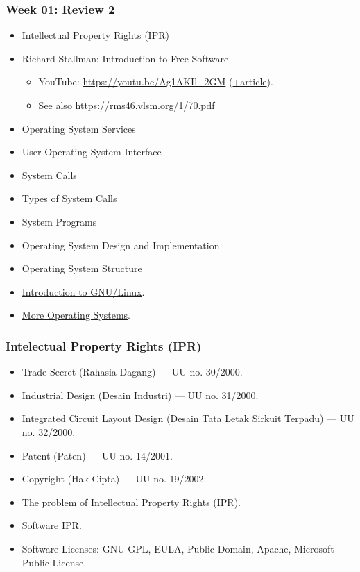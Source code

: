 \documentclass[aspectratio=169, xcolor=table, notheorems, hyperref={pdfpagelabels=false}]{beamer}
\begin{document}

\begin{frame}
\frametitle{Week 01: Review 2}

\begin{itemize}
\item Intellectual Property Rights (IPR)
\item Richard Stallman: Introduction to Free Software
\begin{itemize}
\item YouTube: \url{https://youtu.be/Ag1AKIl_2GM} 
      (\href{https://www.fsf.org/blogs/rms/20140407-geneva-tedx-talk-free-software-free-society}{+article}).
\item See also \url{https://rms46.vlsm.org/1/70.pdf}
\end{itemize}
\item Operating System Services
\item User Operating System Interface
\item System Calls
\item Types of System Calls
\item System Programs
\item Operating System Design and Implementation
\item Operating System Structure
\item \href{https://osp4diss.vlsm.org/Welcome2GNULinux.html}{Introduction to GNU/Linux}.
\item \href{https://osp4diss.vlsm.org/osp-115.html}{More Operating Systems}.
\end{itemize}
\end{frame}

\begin{frame}
\frametitle{Intelectual Property Rights (IPR)}
\begin{itemize}
\item Trade Secret (Rahasia Dagang) --- UU no. 30/2000.
\item Industrial Design (Desain Industri) --- UU no. 31/2000.
\item Integrated Circuit Layout Design (Desain Tata Letak Sirkuit Terpadu) --- UU no. 32/2000.
\item Patent (Paten) --- UU no. 14/2001.
\item Copyright (Hak Cipta) --- UU no. 19/2002.
\item The problem of Intellectual Property Rights (IPR).
\item Software IPR.
\item Software Licenses: GNU GPL, EULA, Public Domain, Apache, Microsoft Public License.
\end{itemize}
\end{frame}
\end{document}
